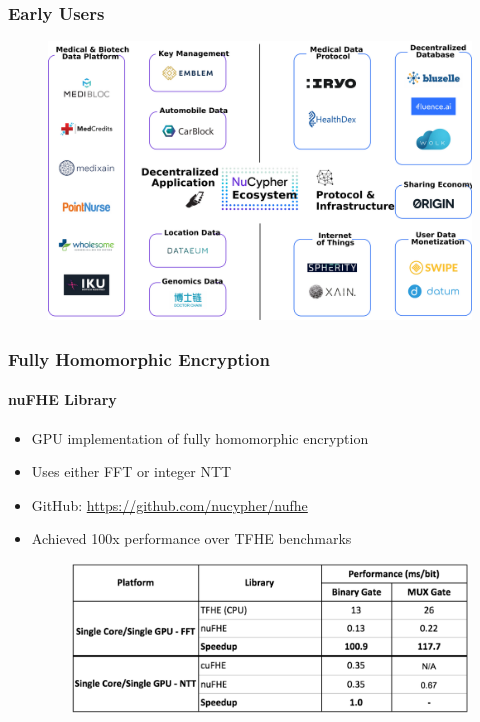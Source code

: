 \documentclass[xetex,mathsans,sans,aspectratio=169]{beamer}
\begin{document}
    \begin{frame}
      \frametitle{Early Users}
      \begin{figure}
           \includegraphics[width=11.5cm]{pdf/projects.pdf}
      \end{figure}
    \end{frame}

    \begin{frame}
      \frametitle{Fully Homomorphic Encryption}
       \framesubtitle{nuFHE Library}
       \begin{itemize}
           \item GPU implementation of fully homomorphic encryption
           \item Uses either FFT or integer NTT
           \item GitHub: \url{https://github.com/nucypher/nufhe}
           \item Achieved 100x performance over TFHE benchmarks
           \begin{figure}
               \includegraphics[width=10.5cm]{pdf/nufhe-benchmarks.pdf}
           \end{figure}
       \end{itemize}
     \end{frame}
\end{document}
